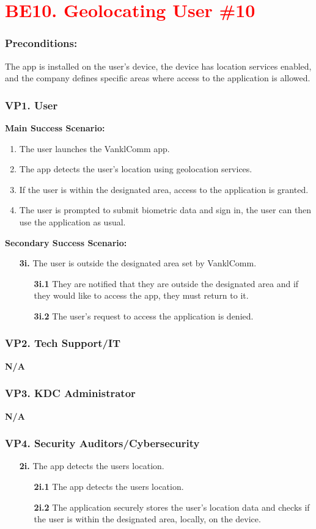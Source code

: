 \documentclass[]{article}
\begin{document}
\section*{\textcolor{red}{BE10. Geolocating User \#10}}
\subsubsection*{Preconditions:} The app is installed on the user's device, the device has location services enabled, and the company defines specific areas where access to the application is allowed.
\subsubsection*{VP1. User}
\textbf{Main Success Scenario:}
\begin{enumerate}
	\item The user launches the VanklComm app.
	\item The app detects the user's location using geolocation services.
	\item If the user is within the designated area, access to the application is granted.
	\item The user is prompted to submit biometric data and sign in, the user can then use the application as usual.
\end{enumerate}
\textbf{Secondary Success Scenario:}
\begin{enumerate}
	\item[\textbf{3i.}] The user is outside the designated area set by VanklComm.
		\begin{enumerate}
			\item[\textbf{3i.1}] They are notified that they are outside the designated area and if they would like to access the app, they must return to it.
			\item[\textbf{3i.2}] The user's request to access the application is denied.
		\end{enumerate}
\end{enumerate}
\subsubsection*{VP2. Tech Support/IT}
\textbf{N/A}
\subsubsection*{VP3. KDC Administrator}
\textbf{N/A}
\subsubsection*{VP4. Security Auditors/Cybersecurity}
\begin{enumerate}
	\item[\textbf{2i.}] The app detects the users location.
		\begin{enumerate}
			\item[\textbf{2i.1}] The app detects the users location.
			\item[\textbf{2i.2}] The application securely stores the user's location data and checks if the user is within the designated area, locally, on the device.
		\end{enumerate}
\end{enumerate}
\end{document}
